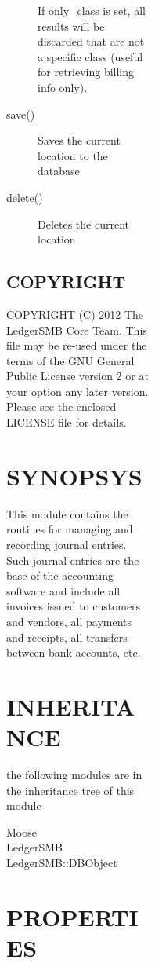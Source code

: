 \begin{description}
\begin{description}
\begin{description}
\begin{description}
\begin{description}
\begin{description}
\begin{description}
\begin{description}
\begin{description}
If only\_class is set, all results will be discarded that are not a specific 
class (useful for retrieving billing info only).


\item[{save()}] \mbox{}

Saves the current location to the database


\item[{delete()}] \mbox{}

Deletes the current location

\end{description}
\subsection*{COPYRIGHT\label{LedgerSMB::DBObject::Entity::Location_COPYRIGHT}}


COPYRIGHT (C) 2012 The LedgerSMB Core Team.  This file may be re-used under the
terms of the GNU General Public License version 2 or at your option any later
version.  Please see the enclosed LICENSE file for details.

\section{SYNOPSYS\label{SYNOPSYS}}


This module contains the routines for managing and recording journal entries.
Such journal entries are the base of the accounting software and include all
invoices issued to customers and vendors, all payments and receipts, all 
transfers between bank accounts, etc.

\section{INHERITANCE\label{INHERITANCE}}


the following modules are in the inheritance tree of this module

\begin{description}

\item[{Moose}] \mbox{}
\item[{LedgerSMB}] \mbox{}
\item[{LedgerSMB::DBObject}] \mbox{}\end{description}
\section{PROPERTIES\label{PROPERTIES}}
\begin{description}


\end{description}
\end{description}
\end{description}
\end{description}
\end{description}
\end{description}
\end{description}
\end{description}
\end{description}
